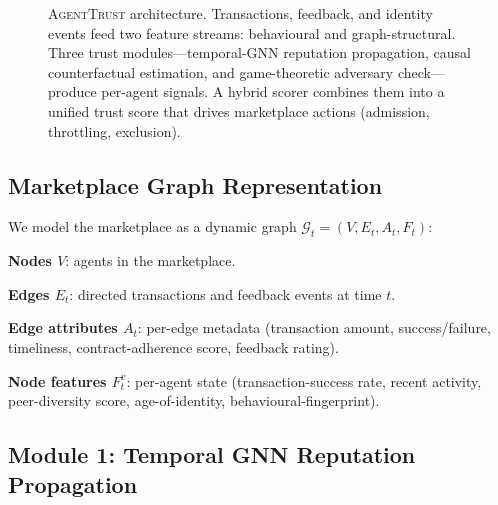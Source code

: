 \documentclass[sigconf,nonacm]{acmart}
\begin{document}
\begin{figure}[t]
\caption{\textsc{AgentTrust} architecture. Transactions, feedback,
  and identity events feed two feature streams: behavioural and
  graph-structural. Three trust modules---temporal-GNN reputation
  propagation, causal counterfactual estimation, and game-theoretic
  adversary check---produce per-agent signals. A hybrid scorer
  combines them into a unified trust score that drives marketplace
  actions (admission, throttling, exclusion).}
\label{fig:framework}
\end{figure}

\subsection{Marketplace Graph Representation}

We model the marketplace as a dynamic graph $\mathcal{G}_t = (V, E_t,
A_t, F_t)$:

\textbf{Nodes $V$}: agents in the marketplace.

\textbf{Edges $E_t$}: directed transactions and feedback events at
time $t$.

\textbf{Edge attributes $A_t$}: per-edge metadata (transaction
amount, success/failure, timeliness, contract-adherence score,
feedback rating).

\textbf{Node features $F_t^v$}: per-agent state (transaction-success
rate, recent activity, peer-diversity score, age-of-identity,
behavioural-fingerprint).

\subsection{Module 1: Temporal GNN Reputation Propagation}
\end{document}
